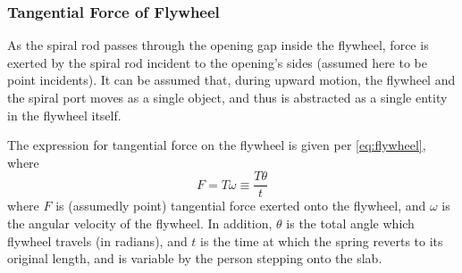 \documentclass[conference]{IEEEtran}
\begin{document}

\subsubsection{Tangential Force of Flywheel}
As the spiral rod passes through the opening gap inside the flywheel, force is exerted by the spiral rod incident to the opening's sides (assumed here to be point incidents). It can be assumed that, during upward motion, the flywheel and the spiral port moves as a single object, and thus is abstracted as a single entity in the flywheel itself.




The expression for tangential force on the flywheel is given per \eqref{eq:flywheel}, where  
\begin{equation}
    \label{eq:flywheel}
    F = T\omega \equiv \frac{T\theta}{t}
\end{equation}
where \(F\) is (assumedly point) tangential force exerted onto the flywheel, and \(\omega\) is the angular velocity of the flywheel. In addition, \(\theta\) is the total angle which flywheel travels (in radians), and \(t\) is the time at which the spring reverts to its original length, and is variable by the person stepping onto the slab.
\end{document}
